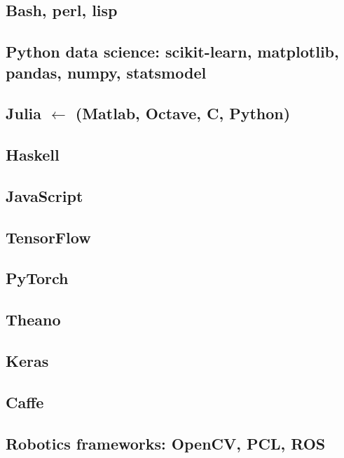 %
%

\subsection{Bash, perl, lisp}

\subsection{Python data science: scikit-learn, matplotlib, pandas,
              numpy, statsmodel}

\subsection{Julia $\leftarrow$ (Matlab, Octave, C, Python)}

\subsection{Haskell}

\subsection{JavaScript}

\subsection{TensorFlow}

\subsection{PyTorch}

\subsection{Theano}

\subsection{Keras}

\subsection{Caffe}

\subsection{Robotics frameworks: OpenCV, PCL, ROS}
